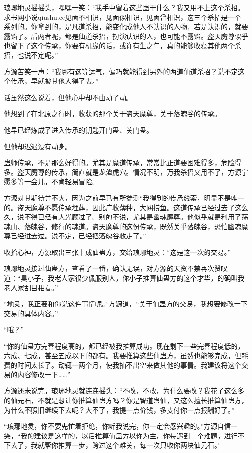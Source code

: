 \begin{this_body}
琅琊地灵摇摇头，嘿嘿一笑：“我手中留着这些蛊干什么？我又用不上这个杀招。求书网小说qiushu.cc见面不相识，见面似相识，见面曾相识，这三个杀招是一个系列的。你拿到的，是凡道杀招，能变化成他人不认识的人物，若是认识的，就要露馅了。后两者呢，都是仙道杀招，扮演认识的人，也可能不露馅。盗天魔尊似乎也留下了这个传承，你要有机缘的话，或许有生之年，真的能够收获其他两个杀招，也说不定呢。”

方源苦笑一声：“我哪有这等运气，偏巧就能得到另外的两道仙道杀招？说不定这个传承，早就被其他人得了去。”

话虽然这么说着，但他心中却不由动了动。

他想到了在北原之行时，收获的那个关于盗天魔尊，关于落魄谷的传承。

他早已经炼成了进入传承的钥匙开门蛊、关门蛊。

但他却迟迟没有动身。

蛊师传承，不是那么好得的。尤其是魔道传承，常常比正道要困难得多，危险得多。盗天魔尊的传承，简直就是龙潭虎穴。情况不明，万我杀招又用不了，方源宁愿多等一会儿，不肯轻易冒险。

方源对其期待并不大，因为之前早已有所揣测“我得到的传承线索，明显不是唯一的。盗天魔尊不愿传承埋葬，因此广收薄种，大网捞鱼。这道传承已经过去了这么久，说不得已经有人光顾过了。别的不说，尤其是幽魂魔尊。他似乎就是利用了荡魂山、落魄谷，修行的魂道。盗天魔尊的这份传承，既然关乎落魄谷，恐怕幽魂魔尊已经进去过。说不定，已经把落魄谷收走了。”

收拾心神，方源取出三张十成仙蛊方，交给琅琊地灵：“这是这一次的交易。”

琅琊地灵接过仙蛊方，查看了一番，确认无误，对方源的天资不禁再次赞叹道：“臭小子，我老人家很少佩服别人，你小子推算仙蛊方的这个才华，的确叫我老人家刮目相看。”

“地灵，我正要和你说这件事情呢。”方源道，“关于仙蛊方的交易，我想要修改一下交易的具体内容。”

“哦？”

“你的仙蛊方完善程度高的，都已经被我推算成功。现在剩下一些完善程度低的，六成、七成，甚至五成以下的都有。我要推算这些仙蛊方，虽然也能够完成，但耗费的时间太长了。动辄一两个月，使我抽不出空来做其他的事情。我建议将这个交易的内容修改一下……”

方源还未说完，琅琊地灵就连连摇头：“不改，不改，为什么要改？我花了这么多的仙元石，不就是想让你推算仙蛊方吗？你是智道蛊仙，又这么擅长推算仙蛊方，为什么不照旧继续下去呢？大不了，我提一点价钱，多支付你一点报酬好了。”

“琅琊地灵，你不要先忙着拒绝，你听我说完，你一定会感兴趣的。”方源自信一笑，“我的建议是这样的，以后推算仙蛊方以你为主，你每遇到一个难题，进行不下去了，我就帮你推算一步，跨过这个难关，每一次只收你两块仙元石。”


\end{this_body}
